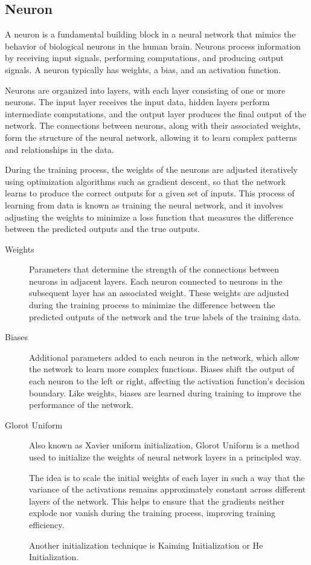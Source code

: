 \documentclass[a4paper]{report}
\begin{document}
\subsection*{Neuron}
A neuron is a fundamental building block in a neural network that mimics the behavior of biological neurons in the human brain. Neurons process information by receiving input signals, performing computations, and producing output signals. A neuron typically has weights, a bias, and an activation function.

Neurons are organized into layers, with each layer consisting of one or more neurons. The input layer receives the input data, hidden layers perform intermediate computations, and the output layer produces the final output of the network. The connections between neurons, along with their associated weights, form the structure of the neural network, allowing it to learn complex patterns and relationships in the data.

During the training process, the weights of the neurons are adjusted iteratively using optimization algorithms such as gradient descent, so that the network learns to produce the correct outputs for a given set of inputs. This process of learning from data is known as training the neural network, and it involves adjusting the weights to minimize a loss function that measures the difference between the predicted outputs and the true outputs.

\begin{description}
\item[Weights]
Parameters that determine the strength of the connections between neurons in adjacent layers. Each neuron connected to neurons in the subsequent layer has an associated weight. These weights are adjusted during the training process to minimize the difference between the predicted outputs of the network and the true labels of the training data.

\item[Biases]
Additional parameters added to each neuron in the network, which allow the network to learn more complex functions. Biases shift the output of each neuron to the left or right, affecting the activation function's decision boundary. Like weights, biases are learned during training to improve the performance of the network.

\item[Glorot Uniform]
Also known as Xavier uniform initialization, Glorot Uniform is a method used to initialize the weights of neural network layers in a principled way. 

The idea is to scale the initial weights of each layer in such a way that the variance of the activations remains approximately constant across different layers of the network. This helps to ensure that the gradients neither explode nor vanish during the training process, improving training efficiency.

Another initialization technique is Kaiming Initialization or He Initialization.
\end{description}
\end{document}

